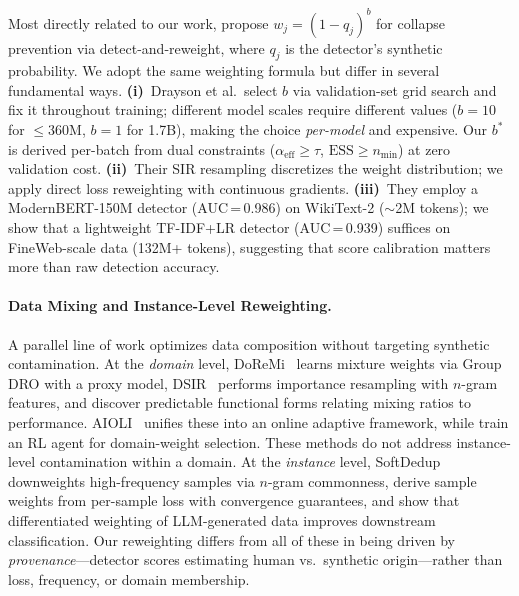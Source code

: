 Most directly related to our work, \citet{drayson_2025_detection_collapse} propose $w_j = (1{-}q_j)^b$ for collapse prevention via detect-and-reweight, where $q_j$ is the detector's synthetic probability.
We adopt the same weighting formula but differ in several fundamental ways.
\textbf{(i)}~Drayson et al.\ select $b$ via validation-set grid search and fix it throughout training; different model scales require different values ($b{=}10$ for ${\leq}360$M, $b{=}1$ for 1.7B), making the choice \emph{per-model} and expensive.
Our $b^*$ is derived per-batch from dual constraints ($\alpha_{\mathrm{eff}} \geq \tau$, $\mathrm{ESS} \geq n_{\min}$) at zero validation cost.
\textbf{(ii)}~Their SIR resampling discretizes the weight distribution; we apply direct loss reweighting with continuous gradients.
\textbf{(iii)}~They employ a ModernBERT-150M detector (AUC\,=\,0.986) on WikiText-2 (${\sim}$2M tokens); we show that a lightweight TF-IDF+LR detector (AUC\,=\,0.939) suffices on FineWeb-scale data (132M+ tokens), suggesting that score calibration matters more than raw detection accuracy.

\paragraph{Data Mixing and Instance-Level Reweighting.}
A parallel line of work optimizes data composition without targeting synthetic contamination.
At the \emph{domain} level, DoReMi~\citep{xie_2023_doremi} learns mixture weights via Group DRO with a proxy model, DSIR~\citep{xie_2023_dsir} performs importance resampling with $n$-gram features, and \citet{ye_2025_data_mixing_laws} discover predictable functional forms relating mixing ratios to performance.
AIOLI~\citep{chen_2025_aioli} unifies these into an online adaptive framework, while \citet{yang_2026_data_mixing_agent} train an RL agent for domain-weight selection.
These methods do not address instance-level contamination within a domain.
At the \emph{instance} level, SoftDedup~\citep{he_2024_softdedup} downweights high-frequency samples via $n$-gram commonness, \citet{sow_2025_dynamic_reweighting} derive sample weights from per-sample loss with convergence guarantees, and \citet{kuo_2024_data_weighting} show that differentiated weighting of LLM-generated data improves downstream classification.
Our reweighting differs from all of these in being driven by \emph{provenance}---detector scores estimating human vs.\ synthetic origin---rather than loss, frequency, or domain membership.

